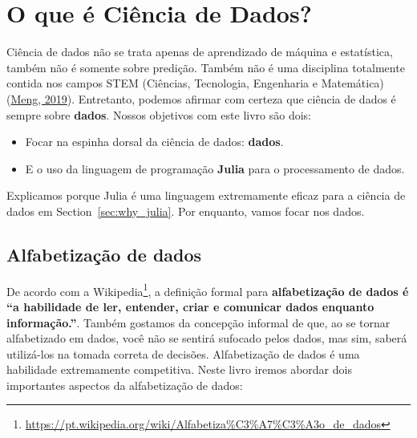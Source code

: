 \documentclass[
  notoc %
]{tufte-book}
\DeclareRobustCommand{\href}[2]{#2\footnote{\url{#1}}}
\providecommand{\tightlist}{%
  \setlength{\itemsep}{0pt}\setlength{\parskip}{0pt}
}
\begin{document}
\hypertarget{sec:why_data_science}{%
\section{O que é Ciência de Dados?}\label{sec:why_data_science}}

Ciência de dados não se trata apenas de aprendizado de máquina e
estatística, também não é somente sobre predição. Também não é uma
disciplina totalmente contida nos campos STEM (Ciências, Tecnologia,
Engenharia e Matemática) (\protect\hyperlink{ref-Meng2019Data}{Meng,
2019}). Entretanto, podemos afirmar com certeza que ciência de dados é
sempre sobre \textbf{dados}. Nossos objetivos com este livro são dois:

\begin{itemize}
\tightlist
\item
  Focar na espinha dorsal da ciência de dados: \textbf{dados}.
\item
  E o uso da linguagem de programação \textbf{Julia} para o
  processamento de dados.
\end{itemize}

Explicamos porque Julia é uma linguagem extremamente eficaz para a
ciência de dados em Section~\ref{sec:why_julia}. Por enquanto, vamos
focar nos dados.

\hypertarget{sec:data_literacy}{%
\subsection{Alfabetização de dados}\label{sec:data_literacy}}

De acordo com a
\href{https://pt.wikipedia.org/wiki/Alfabetiza\%C3\%A7\%C3\%A3o_de_dados}{Wikipedia},
a definição formal para \textbf{alfabetização de dados é ``a habilidade
de ler, entender, criar e comunicar dados enquanto informação.''}.
Também gostamos da concepção informal de que, ao se tornar alfabetizado
em dados, você não se sentirá sufocado pelos dados, mas sim, saberá
utilizá-los na tomada correta de decisões. Alfabetização de dados é uma
habilidade extremamente competitiva. Neste livro iremos abordar dois
importantes aspectos da alfabetização de dados:
\end{document}
